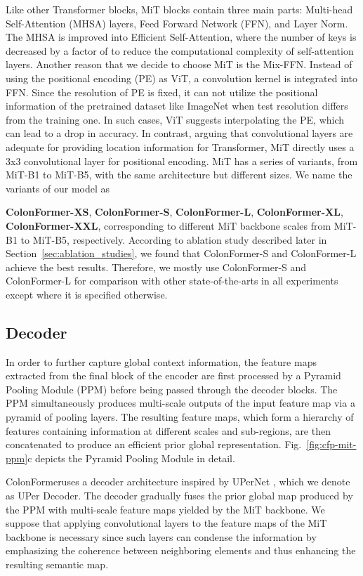 \documentclass{article}
\newcommand{\ModelName}{ColonFormer}
\begin{document}
Like other Transformer blocks, MiT blocks contain three main parts: Multi-head Self-Attention (MHSA) layers, Feed Forward Network (FFN), and Layer Norm. The MHSA is improved into Efficient Self-Attention, where the number of keys is decreased by a factor of  to reduce the computational complexity of self-attention layers. Another reason that we decide to choose MiT is the Mix-FFN. Instead of using the positional encoding (PE) as ViT, a  convolution kernel is integrated into FFN. Since the resolution of PE is fixed, it can not utilize the positional information of the pretrained dataset like ImageNet when test resolution differs from the training one. In such cases, ViT \cite{vit} suggests interpolating the PE, which can lead to a drop in accuracy. In contrast, arguing that convolutional layers are adequate for providing location information for Transformer, MiT directly uses a 3x3 convolutional layer for positional encoding. MiT has a series of variants, from MiT-B1 to MiT-B5, with the same architecture but different sizes. We name the variants of our model as {\textbf{{\ModelName-XS}}, {\textbf{\ModelName-S}}, {\textbf{\ModelName-L}}, {\textbf{\ModelName-XL}}, {\textbf{\ModelName-XXL}}, corresponding to different MiT backbone scales from MiT-B1 to MiT-B5, respectively.
According to ablation study described later in Section~\ref{sec:ablation_studies}, we found that {\ModelName-S} and {\ModelName-L} achieve the best results. Therefore, we mostly use {\ModelName-S} and {\ModelName-L} for comparison with other state-of-the-arts in all experiments except where it is specified otherwise. 



\subsection{Decoder}


In order to further capture global context information, the feature maps extracted from the final block of the encoder are first processed by a Pyramid Pooling Module (PPM) \cite{ppm} before being passed through the decoder blocks. The PPM simultaneously produces multi-scale outputs of the input feature map via a pyramid of pooling layers. The resulting feature maps, which form a hierarchy of features containing information at different scales and sub-regions, are then concatenated to produce an efficient prior global representation. Fig.~\ref{fig:cfp-mit-ppm}c depicts the Pyramid Pooling Module in detail.

\ModelName uses a decoder architecture inspired by UPerNet \cite{upernet}, which we denote as UPer Decoder. The decoder gradually fuses the prior global map produced by the PPM with multi-scale feature maps yielded by the MiT backbone. We suppose that applying convolutional layers to the feature maps of the MiT backbone is necessary since such layers can condense the information by emphasizing the coherence between neighboring elements and thus enhancing the resulting semantic map. 

}
\end{document}

